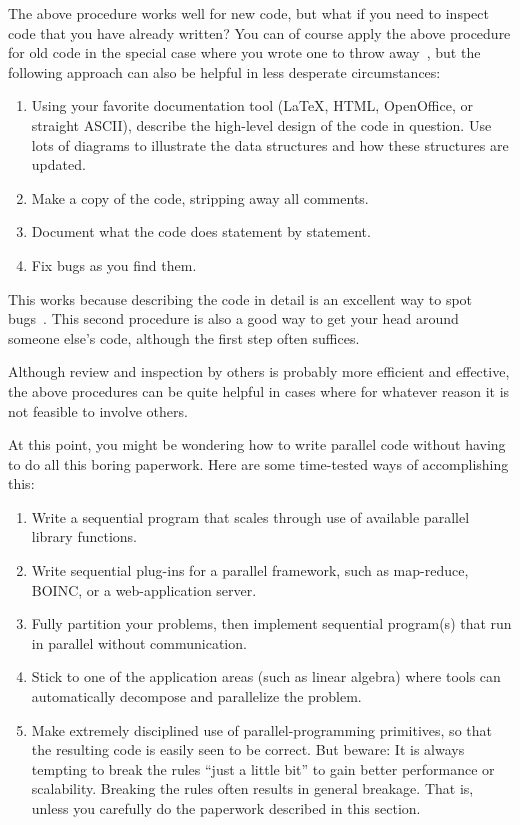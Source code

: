 The above procedure works well for new code, but what if you need to
inspect code that you have already written?
You can of course apply the above procedure for old code in the special
case where you wrote one to throw away~\cite{Brooks79},
but the following approach can also be helpful in less desperate
circumstances:

\begin{enumerate}
\item	Using your favorite documentation tool (\LaTeX{}, HTML,
	OpenOffice, or straight ASCII), describe the high-level
	design of the code in question.
	Use lots of diagrams to illustrate the data structures
	and how these structures are updated.
\item	Make a copy of the code, stripping away all comments.
\item	Document what the code does statement by statement.
\item	Fix bugs as you find them.
\end{enumerate}

This works because describing the code in detail is an excellent way to spot
bugs~\cite{GlenfordJMyers1979}.
This second procedure is also a good way to get your head around
someone else's code, although the first step often suffices.

Although review and inspection by others is probably more efficient and
effective, the above procedures can be quite helpful in cases where
for whatever reason it is not feasible to involve others.

At this point, you might be wondering how to write parallel code without
having to do all this boring paperwork.
Here are some time-tested ways of accomplishing this:

\begin{enumerate}
\item	Write a sequential program that scales through use of
	available parallel library functions.
\item	Write sequential plug-ins for a parallel framework,
	such as map-reduce, BOINC, or a web-application server.
\item	Fully partition your problems, then implement sequential
	program(s) that run in parallel without communication.
\item	Stick to one of the application areas (such as linear algebra)
	where tools can automatically decompose and parallelize
	the problem.
\item	Make extremely disciplined use of parallel-programming
	primitives, so that the resulting code is easily seen to be correct.
	But beware:
	It is always tempting to break the rules ``just a little bit''
	to gain better performance or scalability.
	Breaking the rules often results in general breakage.
	That is, unless you carefully do the paperwork described in this
	section.
\end{enumerate}


